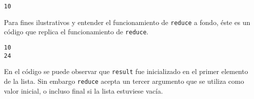 \begin{verbatim}
10
\end{verbatim}

Para fines ilustrativos y entender el funcionamiento de \texttt{reduce}
a fondo, éste es un código que replica el funcionamiento de
\texttt{reduce}.

\begin{Shaded}
\begin{Highlighting}[]
\OperatorTok{=}\NormalTok{ sequence[}\NormalTok{]}
      \NormalTok{ sequence[}\NormalTok{:]:}
\OperatorTok{=}\NormalTok{)}

\OperatorTok{+}\NormalTok{y, [}\NormalTok{,}\NormalTok{,}\NormalTok{,}\NormalTok{]))}
\OperatorTok{*}\NormalTok{y, [}\NormalTok{,}\NormalTok{,}\NormalTok{,}\NormalTok{]))}
\end{Highlighting}
\end{Shaded}

\begin{verbatim}
10
24
\end{verbatim}

En el código se puede observar que \texttt{result} fue inicializado en
el primer elemento de la lista. Sin embargo \texttt{reduce} acepta un
tercer argumento que se utiliza como valor inicial, o incluso final si
la lista estuviese vacía.

\begin{Shaded}
\begin{Highlighting}[]
\NormalTok{(}\NormalTok{(}\OperatorTok{+}\NormalTok{y, [}\NormalTok{,}\NormalTok{,}\NormalTok{,}\NormalTok{], }\NormalTok{))}
\NormalTok{(}\NormalTok{(}\OperatorTok{*}\NormalTok{y, [}\NormalTok{,}\NormalTok{,}\NormalTok{,}\NormalTok{], }\NormalTok{))}
\end{Highlighting}
\end{Shaded}

